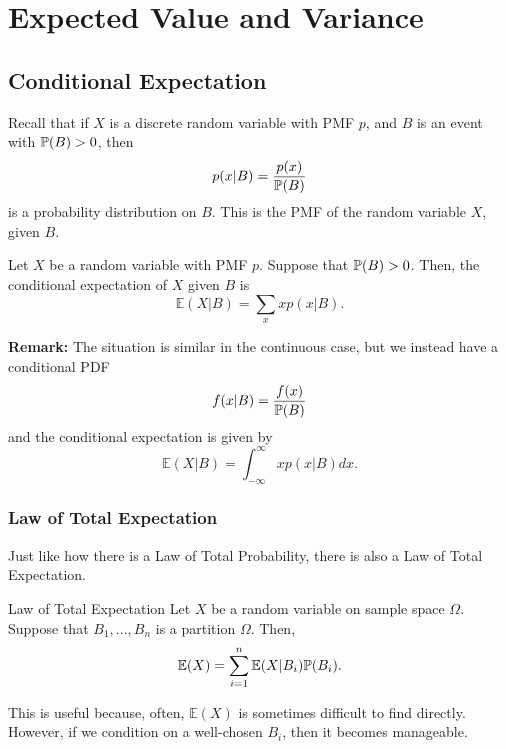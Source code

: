 \documentclass[letterpaper]{article}
\begin{document}
\section{Expected Value and Variance}
\subsection{Conditional Expectation}
Recall that if $X$ is a discrete random variable with PMF $p$, and $B$ is an event with $\mathbb{P}(B) > 0$, then 
\[p(x | B) = \frac{p(x)}{\mathbb{P}(B)}\]
is a probability distribution on $B$. This is the PMF of the random variable $X$, given $B$. 

\begin{definition}{}{}
    Let $X$ be a random variable with PMF $p$. Suppose that $\mathbb{P}(B) > 0$. Then, the conditional expectation of $X$ given $B$ is 
    \[\mathbb{E}(X | B) = \sum_{x} xp(x | B).\]    
\end{definition}
\textbf{Remark:} The situation is similar in the continuous case, but we instead have a conditional PDF 
\[f(x | B) = \frac{f(x)}{\mathbb{P}(B)}\]
and the conditional expectation is given by  
\[\mathbb{E}(X | B) = \int_{-\infty}^{\infty} xp(x | B) dx.\]  


\subsubsection{Law of Total Expectation}
Just like how there is a Law of Total Probability, there is also a Law of Total Expectation. 
\begin{theorem}{Law of Total Expectation}{}
    Let $X$ be a random variable on sample space $\Omega$. Suppose that $B_1, \dots, B_n$ is a partition $\Omega$. Then, 
    \[\mathbb{E}(X) = \sum_{i = 1}^{n} \mathbb{E}(X | B_i) \mathbb{P}(B_i).\]
\end{theorem}
This is useful because, often, $\mathbb{E}(X)$ is sometimes difficult to find directly. However, if we condition on a well-chosen $B_i$, then it becomes manageable. 
\end{document}
